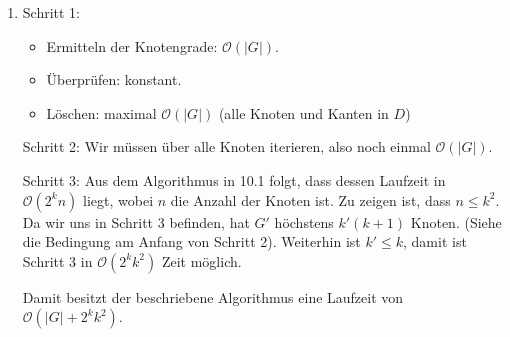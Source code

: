 \documentclass[a4paper]{scrartcl}
\newcommand{\Oh}{\mathcal{O}}
\begin{document}
\begin{enumerate}[label=\bfseries \arabic*.]
\begin{enumerate}
    \item %
        Schritt 1:
        \begin{itemize}
            \item Ermitteln der Knotengrade: $\Oh(|G|)$.
            \item Überprüfen: konstant.
            \item Löschen: maximal $\Oh(|G|)$ (alle Knoten und Kanten in $D$)
        \end{itemize}

        Schritt 2:
        Wir müssen über alle Knoten iterieren, also noch einmal $\Oh(|G|)$.

        Schritt 3:
        Aus dem Algorithmus in 10.1 folgt, dass dessen Laufzeit in $\Oh(2^k n)$ liegt,
        wobei $n$ die Anzahl der Knoten ist. Zu zeigen ist, dass $n \leq k^2$.
        Da wir uns in Schritt 3 befinden, hat $G'$ höchstens $k'(k+1)$ Knoten.
        (Siehe die Bedingung am Anfang von Schritt 2).
        Weiterhin ist $k' \leq k$, damit ist Schritt 3 in $\Oh(2^kk^2)$ Zeit möglich.

        Damit besitzt der beschriebene Algorithmus eine Laufzeit von
        $\Oh(|G| + 2^kk^2)$.

\end{enumerate}
\end{enumerate}
\end{document}
